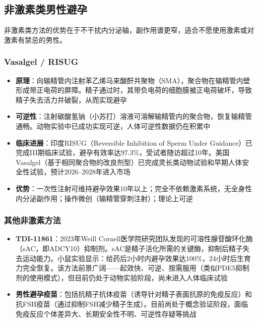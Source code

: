 \subsection{非激素类男性避孕}

非激素类方法的优势在于不干扰内分泌轴，副作用谱更窄，适合不愿使用激素或对激素有禁忌的男性。

\subsubsection{Vasalgel / RISUG}

\begin{itemize}[leftmargin=2cm]
	\item \textbf{原理}：向输精管内注射苯乙烯马来酸酐共聚物（SMA），聚合物在输精管内壁形成带正电荷的屏障。精子通过时，其带负电荷的细胞膜被正电荷破坏，导致精子失去活力并破裂，从而实现避孕
	\item \textbf{可逆性}：注射碳酸氢钠（小苏打）溶液可溶解输精管内的聚合物，恢复输精管通畅。动物实验中已成功实现可逆，人体可逆性数据仍在积累中
	\item \textbf{临床进展}：印度RISUG（Reversible Inhibition of Sperm Under Guidance）已完成III期临床试验，避孕有效率达97.3\%，受试者随访超过10年。美国Vasalgel（基于相同聚合物的改良剂型）已完成灵长类动物试验和早期人体安全性试验，预计2026--2028年进入市场
	\item \textbf{优势}：一次性注射可维持避孕效果10年以上；完全不依赖激素系统，无全身性内分泌副作用；操作微创（输精管穿刺注射）；理论上可逆
\end{itemize}

\subsubsection{其他非激素方法}

\begin{itemize}[leftmargin=2cm]
	\item \textbf{TDI-11861}：2023年Weill Cornell医学院研究团队发现的可溶性腺苷酸环化酶（sAC，即ADCY10）抑制剂。sAC是精子活化所需的关键酶，抑制后精子失去运动能力。小鼠实验显示：给药后2小时内避孕效果达100\%，24小时后生育力完全恢复。该方法前景广阔——起效快、可逆、按需服用（类似PDE5抑制剂的使用模式），但目前仍处于动物实验阶段，尚未进入人体临床试验
	\item \textbf{男性避孕疫苗}：包括抗精子抗体疫苗（诱导针对精子表面抗原的免疫反应）和抗FSH疫苗（通过抑制FSH减少精子生成）。目前尚处于概念验证阶段，面临免疫反应个体差异大、长期安全性不明、可逆性存疑等挑战
\end{itemize}

